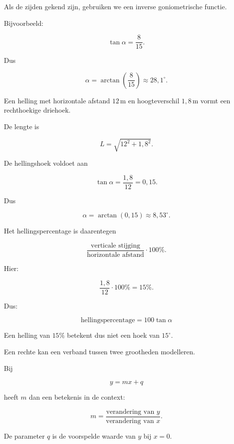 \documentclass{ximera}
\begin{document}
\begin{voorbeeld}

Als de zijden gekend zijn, gebruiken we een inverse goniometrische functie.

Bijvoorbeeld:

\[
\tan\alpha=\frac8{15}.
\]

Dus

\[
\alpha
=
\arctan\left(\frac8{15}\right)
\approx28{,}1^\circ.
\]

\end{voorbeeld}



\begin{voorbeeld}

Een helling met horizontale afstand \(12\,\mathrm m\) en hoogteverschil
\(1{,}8\,\mathrm m\) vormt een rechthoekige driehoek.

De lengte is

\[
L
=
\sqrt{12^2+1{,}8^2}.
\]

De hellingshoek voldoet aan

\[
\tan\alpha
=
\frac{1{,}8}{12}
=
0{,}15.
\]

Dus

\[
\alpha
=
\arctan(0{,}15)
\approx8{,}53^\circ.
\]

Het hellingspercentage is daarentegen

\[
\frac{\text{verticale stijging}}
{\text{horizontale afstand}}
\cdot100\%.
\]

Hier:

\[
\frac{1{,}8}{12}\cdot100\%
=
15\%.
\]

Dus:

\[
\boxed{
\text{hellingspercentage}=100\tan\alpha
}
\]

Een helling van \(15\%\) betekent dus niet een hoek van \(15^\circ\).

\end{voorbeeld}

Een rechte kan een verband tussen twee grootheden modelleren.

Bij

\[
y=mx+q
\]

heeft \(m\) dan een betekenis in de context:

\[
m=
\frac{\text{verandering van }y}
{\text{verandering van }x}.
\]

De parameter \(q\) is de voorspelde waarde van \(y\) bij \(x=0\).
\end{document}
